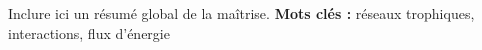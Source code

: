Inclure ici un résumé global de la maîtrise.
\vfill{}
\textbf{Mots clés :} réseaux trophiques, interactions, flux d'énergie

